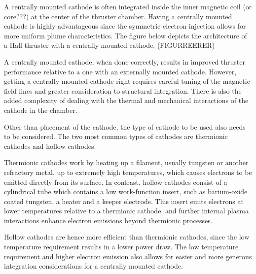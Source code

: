 A centrally mounted cathode is often integrated inside the inner magnetic coil (or core???) at the center of the thruster chamber. Having a centrally mounted cathode is highly advantageous since the symmetric electron injection allows for more uniform plume characteristics. The figure below depicts the architecture of a Hall thruster with a centrally mounted cathode. 
(FIGURREERER)

A centrally mounted cathode, when done correctly, results in improved thruster performance relative to a one with an externally mounted cathode. However, getting a centrally mounted cathode right requires careful tuning of the magnetic field lines and greater consideration to structural integration. There is also the added complexity of dealing with the thermal and mechanical interactions of the cathode in the chamber.

Other than placement of the cathode, the type of cathode to be used also needs to be considered. The two most common types of cathodes are thermionic cathodes and hollow cathodes. 

Thermionic cathodes work by heating up a filament, usually tungsten or another refractory metal, up to extremely high temperatures, which causes electrons to be emitted directly from its surface. In contrast, hollow cathodes consist of a cylindrical tube which contains a low work-function insert, such as barium-oxide coated tungsten, a heater and a keeper electrode. This insert emits electrons at lower temperatures relative to a thermionic cathode, and further internal plasma interactions enhance electron emissions beyond thermionic processes.   

Hollow cathodes are hence more efficient than thermionic cathodes, since the low temperature requirement results in a lower power draw. The low temperature requirement and higher electron emission also allows for easier and more generous integration considerations for a centrally mounted cathode. 